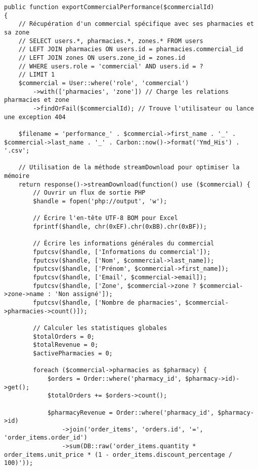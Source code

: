 \documentclass[12pt,a4paper]{article}
\begin{document}
\begin{lstlisting}[caption=Méthode exportCommercialPerformance]
public function exportCommercialPerformance($commercialId)
{
    // Récupération d'un commercial spécifique avec ses pharmacies et sa zone
    // SELECT users.*, pharmacies.*, zones.* FROM users
    // LEFT JOIN pharmacies ON users.id = pharmacies.commercial_id
    // LEFT JOIN zones ON users.zone_id = zones.id
    // WHERE users.role = 'commercial' AND users.id = ?
    // LIMIT 1
    $commercial = User::where('role', 'commercial')
        ->with(['pharmacies', 'zone']) // Charge les relations pharmacies et zone
        ->findOrFail($commercialId); // Trouve l'utilisateur ou lance une exception 404
    
    $filename = 'performance_' . $commercial->first_name . '_' . $commercial->last_name . '_' . Carbon::now()->format('Ymd_His') . '.csv';
    
    // Utilisation de la méthode streamDownload pour optimiser la mémoire
    return response()->streamDownload(function() use ($commercial) {
        // Ouvrir un flux de sortie PHP
        $handle = fopen('php://output', 'w');
        
        // Écrire l'en-tête UTF-8 BOM pour Excel
        fprintf($handle, chr(0xEF).chr(0xBB).chr(0xBF));
        
        // Écrire les informations générales du commercial
        fputcsv($handle, ['Informations du commercial']);
        fputcsv($handle, ['Nom', $commercial->last_name]);
        fputcsv($handle, ['Prénom', $commercial->first_name]);
        fputcsv($handle, ['Email', $commercial->email]);
        fputcsv($handle, ['Zone', $commercial->zone ? $commercial->zone->name : 'Non assigné']);
        fputcsv($handle, ['Nombre de pharmacies', $commercial->pharmacies->count()]);
        
        // Calculer les statistiques globales
        $totalOrders = 0;
        $totalRevenue = 0;
        $activePharmacies = 0;
        
        foreach ($commercial->pharmacies as $pharmacy) {
            $orders = Order::where('pharmacy_id', $pharmacy->id)->get();
            $totalOrders += $orders->count();
            
            $pharmacyRevenue = Order::where('pharmacy_id', $pharmacy->id)
                ->join('order_items', 'orders.id', '=', 'order_items.order_id')
                ->sum(DB::raw('order_items.quantity * order_items.unit_price * (1 - order_items.discount_percentage / 100)'));
            

\end{lstlisting}
\end{document}
